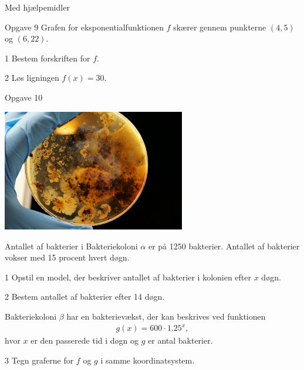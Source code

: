 \documentclass[12pt,x11names,a4paper]{article}
\begin{document}
\newpage

\begin{center}
	\LARGE
	Med hjælpemidler
\end{center}

\begin{opgavetekst}{Opgave 9}
	Grafen for eksponentialfunktionen $f$ skærer gennem punkterne $(4,5)$ og $(6,22)$.
\end{opgavetekst}
\begin{delopgave}{}{1}
	Bestem forskriften for $f$. 
\end{delopgave}
\begin{delopgave}{}{2}
	Løs ligningen $f(x) = 30$. 
\end{delopgave}

\begin{opgavetekst}{Opgave 10}
	\begin{center}
		\includegraphics[width= 0.6\textwidth]{Billeder/Bakterie}
	\end{center}
	Antallet af bakterier i Bakteriekoloni $\alpha$ er på 1250 bakterier. Antallet af bakterier vokser med 15 procent hvert døgn.
\end{opgavetekst}
\begin{delopgave}{}{1}
	Opstil en model, der beskriver antallet af bakterier i kolonien efter $x$ døgn. 
\end{delopgave}
\begin{delopgave}{}{2}
	Bestem antallet af bakterier efter 14 døgn. 
\end{delopgave}
\begin{meretekst}
	Bakteriekoloni $\beta$ har en bakterievækst, der kan beskrives ved funktionen
	\begin{align*}
		g(x) = 600\cdot 1.25^x,
	\end{align*}
	hvor $x$ er den passerede tid i døgn og $g$ er antal bakterier. 
\end{meretekst}
\begin{delopgave}{}{3}
	Tegn graferne for $f$ og $g$ i samme koordinatsystem.
\end{delopgave}
\end{document}
